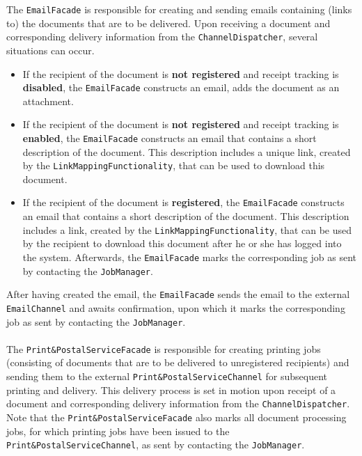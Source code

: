 \documentclass[a4paper,10pt]{article}
\begin{document}
The \texttt{EmailFacade} is responsible for creating and sending emails containing (links to) the documents that are to be delivered. Upon receiving a document and corresponding delivery information from the \texttt{ChannelDispatcher}, several situations can occur.
\begin{itemize}
\item
If the recipient of the document is \textbf{not registered} and receipt tracking is \textbf{disabled}, the \texttt{EmailFacade} constructs an email, adds the document as an attachment.
\item
If the recipient of the document is \textbf{not registered} and receipt tracking is \textbf{enabled}, the \texttt{EmailFacade} constructs an email that contains a short description of the document. This description includes a unique link, created by the \texttt{LinkMappingFunctionality}, that can be used to download this document.
\item
If the recipient of the document is \textbf{registered}, the \texttt{EmailFacade} constructs an email that contains a short description of the document. This description includes a link, created by the \texttt{LinkMappingFunctionality}, that can be used by the recipient to download this document after he or she has logged into the system. Afterwards, the \texttt{EmailFacade} marks the corresponding job as sent by contacting the \texttt{JobManager}.
\end{itemize}
After having created the email, the \texttt{EmailFacade} sends the email to the external \texttt{EmailChannel} and awaits confirmation, upon which it marks the corresponding job as sent by contacting the \texttt{JobManager}.\\\\
The \texttt{Print\&PostalServiceFacade} is responsible for creating printing jobs (consisting of documents that are to be delivered to unregistered recipients) and sending them to the external \texttt{Print\&PostalServiceChannel} for subsequent printing and delivery. This delivery process is set in motion upon receipt of a document and corresponding delivery information from the \texttt{ChannelDispatcher}. Note that the \texttt{Print\&PostalServiceFacade} also marks all document processing jobs, for which printing jobs have been issued to the \texttt{Print\&PostalServiceChannel}, as sent by contacting the \texttt{JobManager}.\\\\
\end{document}
